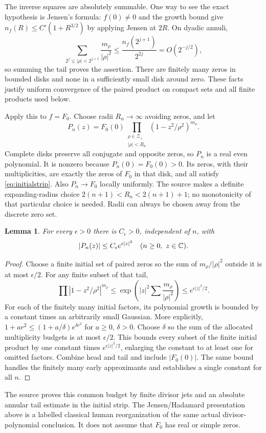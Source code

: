 \documentclass[11pt]{article}
\newtheorem{lemma}[theorem]{Lemma}
\begin{document}
The inverse squares are absolutely summable. One way to see the exact
hypothesis is Jensen's formula: $f(0)\ne0$ and the growth bound give
$n_f(R)\le C'(1+R^{3/2})$ by applying Jensen at $2R$. On dyadic annuli,
\[
 \sum_{2^j\le|\rho|<2^{j+1}}\frac{m_\rho}{|\rho|^2}
 \le\frac{n_f(2^{j+1})}{2^{2j}}=O(2^{-j/2}),
\]
so summing the tail proves the assertion. There are finitely many zeros
in bounded disks and none in a sufficiently small disk around zero.
These facts justify uniform convergence of the paired product on compact
sets and all finite products used below.

Apply this to $f=F_0$. Choose radii $R_n\to\infty$ avoiding zeros, and let
\begin{equation}\label{eq:polys}
 P_n(z)=F_0(0)\prod_{\substack{\rho\in\mathcal Z_+\\|\rho|<R_n}}
                          (1-z^2/\rho^2)^{m_\rho}.
\end{equation}
Complete disks preserve all conjugate and opposite zeros, so $P_n$ is a
real even polynomial. It is nonzero because $P_n(0)=F_0(0)>0$.
Its zeros, with their multiplicities, are exactly the zeros of $F_0$ in
that disk, and all satisfy \eqref{eq:initialstrip}. Also $P_n\to F_0$
locally uniformly. The source makes a definite expanding-radius choice
$2(n+1)<R_n<2(n+1)+1$; no monotonicity of that particular choice is
needed. Radii can always be chosen away from the discrete zero set.

\begin{lemma}\label{lem:budget}
For every $\epsilon>0$ there is $C_\epsilon>0$, independent of $n$, with
\[
 |P_n(z)|\le C_\epsilon e^{\epsilon|z|^2}\quad(n\ge0,\ z\in\mathbb C).
\]
\end{lemma}
\begin{proof}
Choose a finite initial set of paired zeros so the sum of
$m_\rho/|\rho|^2$ outside it is at most $\epsilon/2$. For any finite
subset of that tail,
\[
 \prod|1-z^2/\rho^2|^{m_\rho}
 \le\exp\left(|z|^2\sum\frac{m_\rho}{|\rho|^2}\right)
 \le e^{\epsilon|z|^2/2}.
\]
For each of the finitely many initial factors, its polynomial growth is
bounded by a constant times an arbitrarily small Gaussian. More
explicitly, $1+a r^2\le(1+a/\delta)e^{\delta r^2}$ for $a\ge0$,
$\delta>0$. Choose $\delta$ so the sum of the allocated multiplicity
budgets is at most $\epsilon/2$. This bounds every subset of the finite
initial product by one constant times $e^{\epsilon|z|^2/2}$, enlarging
the constant to at least one for omitted factors. Combine head and tail
and include $|F_0(0)|$. The same bound handles the finitely many early
approximants and establishes a single constant for all $n$.
\end{proof}
The source proves this common budget by finite divisor jets and an
absolute annular tail estimate in the initial strip. The Jensen/Hadamard
presentation above is a labelled classical human reorganization of the
same actual divisor-polynomial conclusion. It does not assume that
$F_0$ has real or simple zeros.
\end{document}
